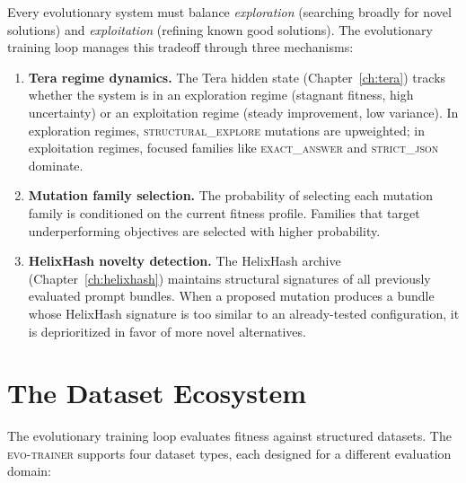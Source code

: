 Every evolutionary system must balance \emph{exploration} (searching broadly for novel solutions) and \emph{exploitation} (refining known good solutions). The evolutionary training loop manages this tradeoff through three mechanisms:

\begin{enumerate}[leftmargin=1.8em]
  \item \textbf{Tera regime dynamics.} The Tera hidden state (Chapter~\ref{ch:tera}) tracks whether the system is in an exploration regime (stagnant fitness, high uncertainty) or an exploitation regime (steady improvement, low variance). In exploration regimes, \textsc{structural\_explore} mutations are upweighted; in exploitation regimes, focused families like \textsc{exact\_answer} and \textsc{strict\_json} dominate.

  \item \textbf{Mutation family selection.} The probability of selecting each mutation family is conditioned on the current fitness profile. Families that target underperforming objectives are selected with higher probability.

  \item \textbf{HelixHash novelty detection.} The HelixHash archive (Chapter~\ref{ch:helixhash}) maintains structural signatures of all previously evaluated prompt bundles. When a proposed mutation produces a bundle whose HelixHash signature is too similar to an already-tested configuration, it is deprioritized in favor of more novel alternatives.
\end{enumerate}

\section{The Dataset Ecosystem}
\label{sec:datasets}

The evolutionary training loop evaluates fitness against structured datasets. The \textsc{evo-trainer} supports four dataset types, each designed for a different evaluation domain:

